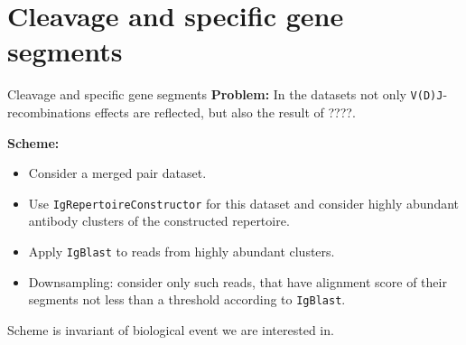\documentclass{beamer}\usepackage[]{graphicx}\usepackage[]{color}
\begin{document}
\section{Cleavage and specific gene segments}
\begin{frame}{Cleavage and specific gene segments}
  \textbf{Problem:} In the datasets not only \texttt{V(D)J}-recombinations effects are reflected, but also the result of ????.
 
  \pause
  \bigskip 
  \textbf{Scheme:}
  \begin{itemize}
    \item Consider a merged pair dataset.
    \pause
    \item Use \texttt{IgRepertoireConstructor} for this dataset and consider {\color{blue} highly abundant antibody clusters} of the constructed repertoire.
    \pause
    \item Apply \texttt{IgBlast} to reads from highly abundant clusters.
    \pause
    \item {\color{blue} Downsampling}: consider only such reads, that have alignment score of their segments not less than a {\color{blue} threshold} according to \texttt{IgBlast}.
  \end{itemize}

  \bigskip
  {\color{blue} Scheme is invariant of biological event we are interested in.}
\end{frame}
\end{document}

